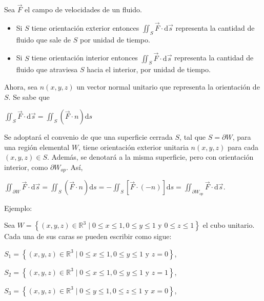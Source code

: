 \documentclass[fleqn]{article}
\begin{document}
    Sea $ \overrightarrow{F}  $ el campo de velocidades de un fluido. 

    \begin{itemize}
        \item Si $ S $ tiene orientación exterior entonces $ \displaystyle \iint_S \overrightarrow{F} \cdot \mathrm{d} \overrightarrow{s} $ representa la cantidad de fluido que sale de $ S $ por unidad de tiempo.
        
        \item Si $ S $ tiene orientación interior entonces $ \displaystyle \iint_S \overrightarrow{F} \cdot \mathrm{d} \overrightarrow{s} $ representa la cantidad de fluido que atraviesa $ S $ hacia el interior, por unidad de tiempo.
    \end{itemize}

    Ahora, sea $ n(x,y,z) $ un vector normal unitario que representa la orientación de $ S $. Se sabe que

    $ \displaystyle \iint_S \overrightarrow{F} \cdot \mathrm{d} \overrightarrow{s} = \displaystyle \iint_S \left(\overrightarrow{F} \cdot n \right) \mathrm{d} s $

    Se adoptará el convenio de que una superficie cerrada $ S $, tal que $ S = \partial W $, para una región elemental $ W $, tiene orientación exterior unitaria $ n(x,y,z) $ para cada $ (x,y,z) \in S $. Además, se denotará a la misma superficie, pero con orientación interior, como $ \partial W_{op} $. Así,

    $ \displaystyle \iint_{\partial W} \overrightarrow{F} \cdot \mathrm{d} \overrightarrow{s} = \displaystyle \iint_S \left(\overrightarrow{F} \cdot n \right) \mathrm{d} s = - \displaystyle \iint_S \left[\overrightarrow{F} \cdot (-n) \right] \mathrm{d} s = \displaystyle \iint_{\partial W_{op}} \overrightarrow{F} \cdot \mathrm{d} \overrightarrow{s} $.

    Ejemplo:

    Sea $ W = \left\lbrace (x,y,z) \in \mathbb{R}^3 \; \big| \; 0 \leq x \leq 1, 0 \leq y \leq 1 \text{ y } 0 \leq z \leq 1 \right\rbrace $ el cubo unitario. Cada una de sus caras se pueden escribir como sigue:

    $ S_1 = \left\lbrace (x,y,z) \in \mathbb{R}^3 \; \big| \; 0 \leq x \leq 1, 0 \leq y \leq 1 \text{ y } z = 0 \right\rbrace $,

    $ S_2 = \left\lbrace (x,y,z) \in \mathbb{R}^3 \; \big| \; 0 \leq x \leq 1, 0 \leq y \leq 1 \text{ y } z = 1 \right\rbrace $,

    $ S_3 = \left\lbrace (x,y,z) \in \mathbb{R}^3 \; \big| \; 0 \leq y \leq 1, 0 \leq z \leq 1 \text{ y } x = 0 \right\rbrace $,
\end{document}
